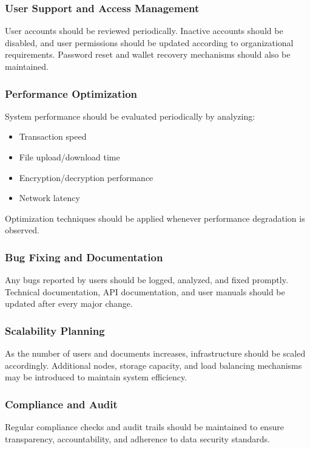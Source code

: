 \documentclass[12pt]{article}
\begin{document}
\subsubsection{User Support and Access Management}
User accounts should be reviewed periodically. Inactive accounts should be disabled, and user permissions should be updated according to organizational requirements. Password reset and wallet recovery mechanisms should also be maintained.

\subsubsection{Performance Optimization}
System performance should be evaluated periodically by analyzing:

\begin{itemize}
    \item Transaction speed
    \item File upload/download time
    \item Encryption/decryption performance
    \item Network latency
\end{itemize}

Optimization techniques should be applied whenever performance degradation is observed.

\subsubsection{Bug Fixing and Documentation}
Any bugs reported by users should be logged, analyzed, and fixed promptly. Technical documentation, API documentation, and user manuals should be updated after every major change.

\subsubsection{Scalability Planning}
As the number of users and documents increases, infrastructure should be scaled accordingly. Additional nodes, storage capacity, and load balancing mechanisms may be introduced to maintain system efficiency.

\subsubsection{Compliance and Audit}
Regular compliance checks and audit trails should be maintained to ensure transparency, accountability, and adherence to data security standards.
\end{document}
